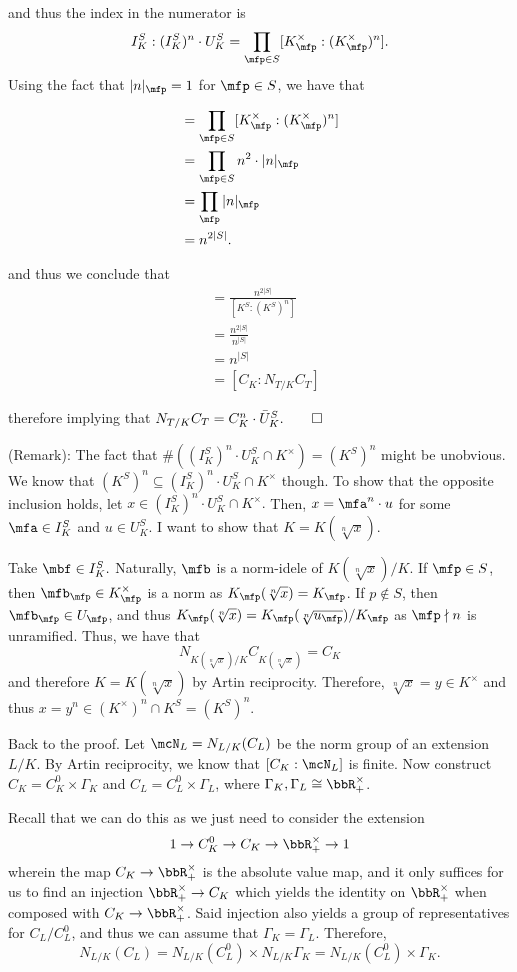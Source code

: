 \documentclass[a4paper, 12pt,oneside,openany]{book}
\begin{document}
and thus the index in the numerator is $$I_K^{S}:(I_K^S)^n \cdot U_K^S = \prod\limits_{\mfp \in S} [K_\mfp^\times : (K_\mfp^\times)^n]. $$ Using the fact that $|n|_\mfp =1$ for $\mfp \in S$, we have that 

\begin{align*}
	[I_K^{S^*}:(I_K^S)^n \cdot U_K^S] &= \prod\limits_{\mfp \in S} [K_\mfp^\times : (K_\mfp^\times)^n] \\
	&= \prod\limits_{\mfp \in S} n^2 \cdot |n|_\mfp \\
	&= \prod\limits_{\mfp} |n|_\mfp \\
	&= n^{2|S|}.
\end{align*}

and thus we conclude that 
\begin{align*}
	[C_K:C_K^n \cdot \bar{U}_K^S] &= \frac{n^{2|S|}}{[K^S: (K^S)^n]}\\
	&= \frac{n^{2|S|}}{n^{|S|}} \\
	&= n^{|S|} \\
	&= [C_K: N_{T/K} C_T]
\end{align*}

therefore implying that $N_{T/K} C_T = C_K^n \cdot \bar{U}_K^S. \qed$

(Remark): The fact that $\#((I_K^S)^n \cdot U_K^S \cap K^\times)= (K^S)^n$ might be unobvious. We know that $(K^S)^n \subseteq (I_K^S)^n \cdot U_K^S \cap K^\times$ though. To show that the opposite inclusion holds, let $x \in (I_K^S)^n \cdot U_K^S \cap K^\times.$ Then, $x = \mfa^n \cdot u$ for some $\mfa \in I_K^S$ and $u \in U_K^S$. I want to show that $K = K(\sqrt[n]{x})$. 

Take $\mbf \in I_K^S.$ Naturally, $\mfb$ is a norm-idele of $K(\sqrt[n]{x})/K$. If $\mfp \in S$, then $\mfb_\mfp \in K_\mfp^\times$ is a norm as $K_\mfp(\sqrt[n]{x}) = K_\mfp$. If $p \not\in S$, then $\mfb_\mfp \in U_\mfp$, and thus $K_\mfp(\sqrt[n]{x}) = K_\mfp(\sqrt[n]{u_\mfp})/K_\mfp$ as $\mfp \nmid n$ is unramified. Thus, we have that $$N_{K(\sqrt[n]{x})/K} C_{K(\sqrt[n]{x})} = C_K$$ and therefore $K=K(\sqrt[n]{x})$ by Artin reciprocity. Therefore, $\sqrt[n]{x} = y \in K^\times$ and thus $x = y^n \in (K^\times)^n \cap K^S = (K^S)^n$.

Back to the proof. Let $\mcN_L = N_{L/K}(C_L)$ be the norm group of an extension $L/K$. By Artin reciprocity, we know that $[C_K: \mcN_L]$ is finite. Now construct $C_K = C_K^0 \times \Gamma_K$ and $C_L = C_L^0 \times \Gamma_L$, where $\Gamma_K, \Gamma_L \cong \bbR_+^\times$. 

Recall that we can do this as we just need to consider the extension $$1 \to C_K^0 \to C_K \to \bbR^\times_+ \to 1$$ wherein the map $C_K \to \bbR^\times_+$ is the absolute value map, and it only suffices for us to find an injection $\bbR^\times_+ \to C_K$ which yields the identity on $\bbR^\times_+$ when composed with $C_K \to \bbR^\times_+$. Said injection also yields a group of representatives for $C_L/C_L^0$, and thus we can assume that $\Gamma_K = \Gamma_L$. Therefore, $$N_{L/K}(C_L) = N_{L/K}(C_L^0) \times N_{L/K} \Gamma_K = N_{L/K} (C_L^0) \times \Gamma_K.$$
\end{document}
